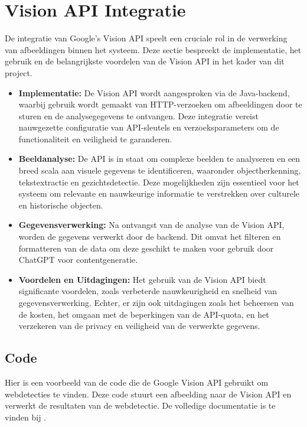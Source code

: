 \section{Vision API Integratie}
De integratie van Google's Vision API speelt een cruciale rol in de verwerking van afbeeldingen binnen het systeem. Deze sectie bespreekt de implementatie, het gebruik en de belangrijkste voordelen van de Vision API in het kader van dit project.

\begin{itemize}
    \item \textbf{Implementatie:} De Vision API wordt aangesproken via de Java-backend, waarbij gebruik wordt gemaakt van HTTP-verzoeken om afbeeldingen door te sturen en de analysegegevens te ontvangen. Deze integratie vereist nauwgezette configuratie van API-sleutels en verzoeksparameters om de functionaliteit en veiligheid te garanderen.
    
    \item \textbf{Beeldanalyse:} De API is in staat om complexe beelden te analyseren en een breed scala aan visuele gegevens te identificeren, waaronder objectherkenning, tekstextractie en gezichtsdetectie. Deze mogelijkheden zijn essentieel voor het systeem om relevante en nauwkeurige informatie te verstrekken over culturele en historische objecten.
    
    \item \textbf{Gegevensverwerking:} Na ontvangst van de analyse van de Vision API, worden de gegevens verwerkt door de backend. Dit omvat het filteren en formatteren van de data om deze geschikt te maken voor gebruik door ChatGPT voor contentgeneratie.
    
    \item \textbf{Voordelen en Uitdagingen:} Het gebruik van de Vision API biedt significante voordelen, zoals verbeterde nauwkeurigheid en snelheid van gegevensverwerking. Echter, er zijn ook uitdagingen zoals het beheersen van de kosten, het omgaan met de beperkingen van de API-quota, en het verzekeren van de privacy en veiligheid van de verwerkte gegevens.
\end{itemize}
\pagebreak
\subsection{Code}
Hier is een voorbeeld van de code die de Google Vision API gebruikt om webdetecties te vinden. Deze code stuurt een afbeelding naar de Vision API en verwerkt de resultaten van de webdetectie. De volledige documentatie is te vinden bij \autocite{googleVisionAPI}.

